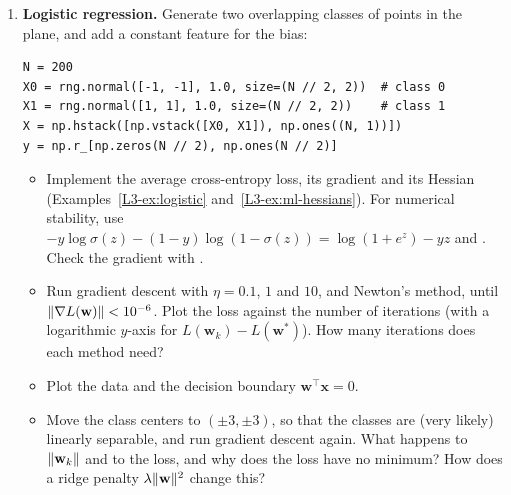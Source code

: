 \begin{enumerate}[label=\textbf{P\arabic*.}, leftmargin=*]
\begin{lstlisting}
def log(x):
    return Var(np.log(x.value), [(x, 1.0 / x.value)])
\end{lstlisting}
    \begin{itemize}
        \item Add subtraction, negation, division, powers with a constant exponent,  and  (for expressions like ), and the functions , ,  and .
        \item Write a method : list all variables that the output depends on in topological order (every variable after its parents, e.g., by a depth-first search), set the adjoint of the output to $1$, and go through the list in reverse order, adding  to  for every pair .
        \item Check your implementation on Example~\ref{L3-ex:autodiff} (you should get $5.5$ and $1.716$), on the logistic regression loss of Example~\ref{L3-ex:logistic}, and on random examples against .
        \item (Forward mode.) Implement a class  that stores a value and a derivative $\dot v$, with the forward rules of Section~\ref{L3-sec:autodiff}, and check it on the same examples.
    \end{itemize}

    \item \textbf{Logistic regression.} Generate two overlapping classes of points in the plane, and add a constant feature for the bias:
\begin{lstlisting}
N = 200
X0 = rng.normal([-1, -1], 1.0, size=(N // 2, 2))  # class 0
X1 = rng.normal([1, 1], 1.0, size=(N // 2, 2))    # class 1
X = np.hstack([np.vstack([X0, X1]), np.ones((N, 1))])
y = np.r_[np.zeros(N // 2), np.ones(N // 2)]
\end{lstlisting}
    \begin{itemize}
        \item Implement the average cross-entropy loss, its gradient and its Hessian (Examples~\ref{L3-ex:logistic} and~\ref{L3-ex:ml-hessians}). For numerical stability, use $-y\log\sigma(z) - (1 - y)\log(1 - \sigma(z)) = \log(1 + e^z) - yz$ and . Check the gradient with .
        \item Run gradient descent with $\eta = 0.1$, $1$ and $10$, and Newton's method, until $\lVert \nabla L(\mathbf{w}) \rVert < 10^{-6}$. Plot the loss against the number of iterations (with a logarithmic $y$-axis for $L(\mathbf{w}_k) - L(\mathbf{w}^*)$). How many iterations does each method need?
        \item Plot the data and the decision boundary $\mathbf{w}^\top\mathbf{x} = 0$.
        \item Move the class centers to $(\pm 3, \pm 3)$, so that the classes are (very likely) linearly separable, and run gradient descent again. What happens to $\lVert \mathbf{w}_k \rVert$ and to the loss, and why does the loss have no minimum? How does a ridge penalty $\lambda\lVert \mathbf{w} \rVert^2$ change this?
    \end{itemize}


\end{enumerate}
